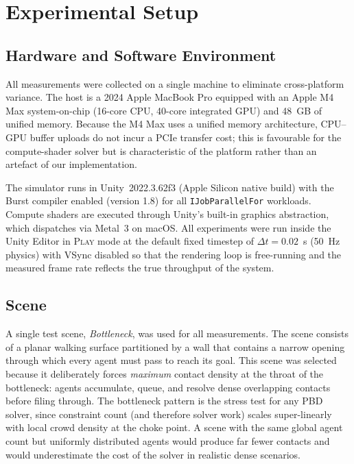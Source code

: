 \section{Experimental Setup}
\label{sec:exp_setup}

\subsection{Hardware and Software Environment}

All measurements were collected on a single machine to eliminate
cross-platform variance.  The host is a 2024 Apple MacBook Pro equipped
with an Apple M4 Max system-on-chip (16-core CPU, 40-core integrated
GPU) and 48~GB of unified memory.  Because the M4 Max uses a unified
memory architecture, CPU--GPU buffer uploads do not incur a PCIe
transfer cost; this is favourable for the compute-shader solver but is
characteristic of the platform rather than an artefact of our
implementation.

The simulator runs in Unity~2022.3.62f3 (Apple Silicon native build)
with the Burst compiler enabled (version 1.8) for all
\texttt{IJobParallelFor} workloads.  Compute shaders are executed
through Unity's built-in graphics abstraction, which dispatches via
Metal~3 on macOS.  All experiments were run inside the Unity Editor in
\textsc{Play} mode at the default fixed timestep of $\Delta t = 0.02$~s
(50~Hz physics) with VSync disabled so that the rendering loop is
free-running and the measured frame rate reflects the true throughput
of the system.

\subsection{Scene}

A single test scene, \textit{Bottleneck}, was used for all
measurements.  The scene consists of a planar walking surface partitioned
by a wall that contains a narrow opening through which every agent must
pass to reach its goal.  This scene was selected because it deliberately
forces \emph{maximum} contact density at the throat of the bottleneck:
agents accumulate, queue, and resolve dense overlapping contacts before
filing through.  The bottleneck pattern is the stress test for any PBD
solver, since constraint count (and therefore solver work) scales
super-linearly with local crowd density at the choke point.  A scene
with the same global agent count but uniformly distributed agents would
produce far fewer contacts and would underestimate the cost of the
solver in realistic dense scenarios.

